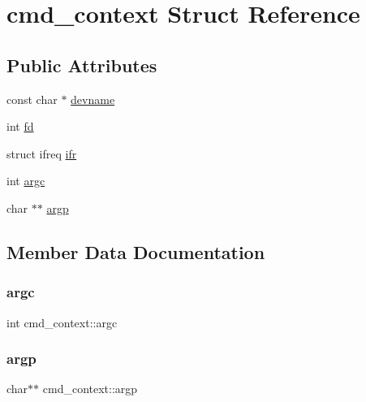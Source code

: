 \hypertarget{structcmd__context}{}\section{cmd\+\_\+context Struct Reference}
\label{structcmd__context}
\subsection*{Public Attributes}
\begin{DoxyCompactItemize}
\item 
const char $\ast$ \hyperlink{structcmd__context_a84ad9849705b15786daff0e543aea66d}{devname}
\item 
int \hyperlink{structcmd__context_a3482941a7d95d94958fd026e984aaad6}{fd}
\item 
struct ifreq \hyperlink{structcmd__context_a372549b7e45b707f07780719bc9f3b06}{ifr}
\item 
int \hyperlink{structcmd__context_a1aa1c9bed1f38cff4fd629b65a8cbca9}{argc}
\item 
char $\ast$$\ast$ \hyperlink{structcmd__context_a3da8652c418242071737d2af141a025f}{argp}
\end{DoxyCompactItemize}


\subsection{Member Data Documentation}
\mbox{\label{structcmd__context_a1aa1c9bed1f38cff4fd629b65a8cbca9}} 
\subsubsection{\texorpdfstring{argc}{argc}}
{\footnotesize\ttfamily int cmd\+\_\+context\+::argc}

\mbox{\label{structcmd__context_a3da8652c418242071737d2af141a025f}} 
\subsubsection{\texorpdfstring{argp}{argp}}
{\footnotesize\ttfamily char$\ast$$\ast$ cmd\+\_\+context\+::argp}


